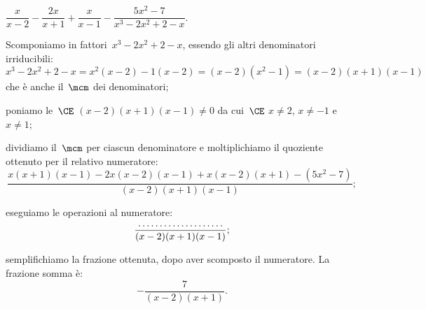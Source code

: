 \begin{exrig}
 \begin{esempio}
$\dfrac{x}{x-2}-\dfrac{2x}{x+1}+\dfrac{x}{x-1}-\dfrac{5x^{2}-7}{x^{3}-2x^{2}+2-x}$.
\begin{itemize*}
 \item Scomponiamo in fattori~$x^{3}-2x^{2}+2-x$, essendo gli altri denominatori
 irriducibili:  $x^{3}-2x^{2}+2-x=x^2(x-2)-1(x-2)=(x-2)\left(x^2-1\right)=(x-2)(x+1)(x-1)$ che è anche il~$\mcm$ dei denominatori;
 \item poniamo le~$\CE$ $(x-2)(x+1)(x-1) \neq 0$ da cui~$\CE$ $x \neq 2$, $ x \neq -1$ e~$x \neq 1$;
 \item dividiamo il~$\mcm$ per ciascun denominatore e moltiplichiamo il quoziente ottenuto per il relativo numeratore:
 \[\frac{x(x+1)(x-1)-2x(x-2)(x-1)+x(x-2)(x+1)-(5x^{2}-7)}{(x-2)(x+1)(x-1)};\]
 \item eseguiamo le operazioni al numeratore:
 \[\frac{\dotfill}{(x-2)(x+1)(x-1)};\]
 \item semplifichiamo la frazione ottenuta, dopo aver scomposto il numeratore. La frazione somma è:
 \[-{\frac{7}{(x-2)(x+1)}}.\]
 \end{itemize*}
 \end{esempio}

\end{exrig}

\ovalbox{\risolvii \ref{ese:14.21}, \ref{ese:14.22}, \ref{ese:14.23}, \ref{ese:14.24}, \ref{ese:14.25}, \ref{ese:14.26}, \ref{ese:14.27}, \ref{ese:14.28}, \ref{ese:14.29}, \ref{ese:14.30}}
\newpage


\cleardoublepage
